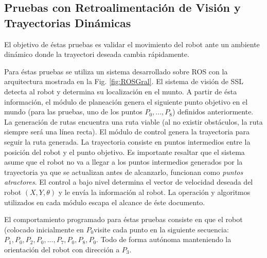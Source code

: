 \documentclass[twocolumn,10pt]{amrob}
\begin{document}
\subsection*{Pruebas con Retroalimentación de Visión y Trayectorias Dinámicas}
El objetivo de éstas pruebas es validar el movimiento del robot ante un ambiente dinámico donde la trayectori deseada cambia rápidamente. 
\par
Para éstas pruebas se utiliza un sistema desarrollado sobre ROS con la arquitectura mostrada en la Fig. \ref{fig:ROSGral}.  El sistema de visión de SSL detecta al robot y determina su localización en el munto. A partir de ésta información, el módulo de planeación genera el siguiente punto objetivo en el mundo (para las pruebas, uno de los puntos $P_0, ..., P_8$) definidos anteriormente. La generación de rutas encuentra una ruta viable (al no existir obstáculos, la ruta siempre será una línea recta). El módulo de control genera la trayectoria para seguir la ruta generada. La trayectoria consiste en puntos intermedios entre la posición del robot y el punto objetivo. Es importante resaltar que el sistema asume que el robot no va a llegar a los puntos intermedios generados por la trayectoria ya que se actualizan antes de alcanzarlo, funcionan como \textit{puntos atractores}. El control a bajo nivel determina el vector de velocidad deseada del robot $(X, Y, \theta)$ y le envía la información al robot. La operación y algoritmos utilizados en cada módulo escapa el alcance de éste documento.
\par
El comportamiento programado para éstas pruebas consiste en que el robot (colocado inicialmente en $P_0$visite cada punto en la siguiente secuencia: $P_1, P_0, P_2, P_0, ..., P_7, P_0, P_8, P_0$. Todo de forma autónoma manteniendo la orientación del robot con dirección a $P_3$. 
\par
\end{document}
